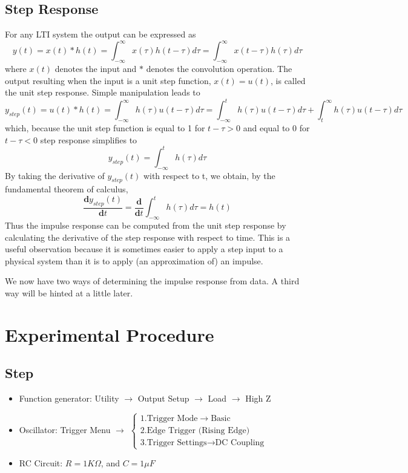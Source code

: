 \documentclass[12pt]{article}
\begin{document}
\subsection{Step Response}
For any LTI system the output can be expressed as
\begin{equation}
y(t)=x(t)*h(t)=\int_{-\infty}^\infty x(\tau)h(t-\tau)d\tau=\int_{-\infty}^\infty x(t-\tau)h(\tau)d\tau
\end{equation}
where $x(t)$ denotes the input and $*$ denotes the convolution operation. The output resulting when the input
is a unit step function, $x(t)=u(t)$, is called the unit step response. Simple manipulation leads to
\begin{equation}
y_{step}(t)=u(t)*h(t)=\int_{-\infty}^\infty h(\tau)u(t-\tau)d\tau=\int_{-\infty}^t h(\tau)u(t-\tau)d\tau+\int_t^\infty h(\tau)u(t-\tau)d\tau
\end{equation}
which, because the unit step function is equal to 1 for $t-\tau>0$ and equal to 0 for $t-\tau<0$ step response simplifies to
\begin{equation}
y_{step}(t)=\int_{-\infty}^th(\tau)d\tau
\end{equation}
By taking the derivative of $y_{step}(t)$ with respect to t, we obtain, by the fundamental theorem of calculus,
\begin{equation}
\frac{\mathbf{d}y_{step}(t)}{\mathbf{d}t}=\frac{\mathbf{d}}{\mathbf{d}t}\int_{-\infty}^th(\tau)d\tau=h(t)
\end{equation}
Thus the impulse response can be computed from the unit step response by calculating the derivative of the
step response with respect to time. This is a useful observation because it is sometimes easier to apply a
step input to a physical system than it is to apply (an approximation of) an impulse.
\par We now have two ways of determining the impulse response from data. A third way will be hinted at a
little later.
\section{Experimental Procedure}
\subsection{Step}
\begin{itemize}
\item Function generator: Utility $\to$ Output Setup $\to$ Load $\to$ High Z
\item Oscillator: Trigger Menu $\to$ 
$\begin{cases}
1.\text{Trigger Mode} \to \text{Basic}\\2.\text{Edge Trigger (Rising Edge)}\\\text{3.Trigger Settings} \to \text{DC Coupling} 
\end{cases}$
\item RC Circuit: $R=1K\Omega$, and $C=1\mu F$
\end{itemize}
\end{document}
